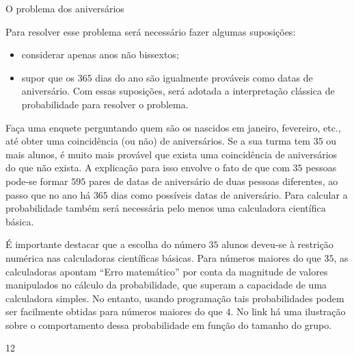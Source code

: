 \begin{sugestions}{O problema dos aniversários}
{
Para resolver esse problema será necessário fazer algumas suposições: 
\begin{itemize}
\item considerar apenas anos não bissextos; 
\item supor que os $365$ dias do ano são igualmente prováveis como datas de aniversário. Com essas suposições, será adotada a interpretação clássica de probabilidade para resolver o problema.
\end{itemize}

Faça uma enquete perguntando quem são os nascidos em janeiro, fevereiro, etc., até obter uma coincidência (ou não) de aniversários. Se a sua turma tem $35$ ou mais alunos, é muito mais provável que exista uma coincidência de aniversários do que não exista. A explicação para isso envolve o fato de que com $35$ pessoas pode-se formar $595$ pares de datas de aniversário de duas pessoas diferentes, ao passo que no ano há $365$ dias como possíveis datas de aniversário. Para calcular a probabilidade também será necessária pelo menos uma calculadora científica básica.

É importante destacar que a escolha do número $35$ alunos deveu-se à restrição numérica nas calculadoras científicas básicas. Para números maiores do que $35$, as calculadoras apontam “Erro matemático”{} por conta da magnitude de valores manipulados no cálculo da probabilidade, que superam a capacidade de uma calculadora simples. No entanto, usando programação tais probabilidades podem ser facilmente obtidas para números maiores do que $4$. No link há uma ilustração sobre o comportamento dessa probabilidade em função do tamanho do grupo.
}{1}{2}
\end{sugestions}
